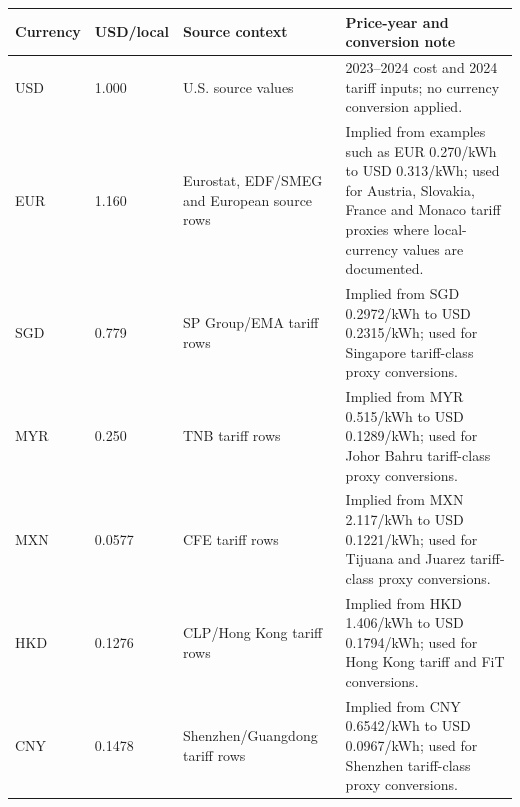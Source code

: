 \begin{tabular}{@{}llp{}p{}@{}}
\toprule
Currency & USD/local & Source context & Price-year and conversion note \\
\midrule
USD & 1.000 & U.S. source values & 2023--2024 cost and 2024 tariff inputs; no currency conversion applied. \\
EUR & 1.160 & Eurostat, EDF/SMEG and European source rows & Implied from examples such as EUR 0.270/kWh to USD 0.313/kWh; used for Austria, Slovakia, France and Monaco tariff proxies where local-currency values are documented. \\
SGD & 0.779 & SP Group/EMA tariff rows & Implied from SGD 0.2972/kWh to USD 0.2315/kWh; used for Singapore tariff-class proxy conversions. \\
MYR & 0.250 & TNB tariff rows & Implied from MYR 0.515/kWh to USD 0.1289/kWh; used for Johor Bahru tariff-class proxy conversions. \\
MXN & 0.0577 & CFE tariff rows & Implied from MXN 2.117/kWh to USD 0.1221/kWh; used for Tijuana and Juarez tariff-class proxy conversions. \\
HKD & 0.1276 & CLP/Hong Kong tariff rows & Implied from HKD 1.406/kWh to USD 0.1794/kWh; used for Hong Kong tariff and FiT conversions. \\
CNY & 0.1478 & Shenzhen/Guangdong tariff rows & Implied from CNY 0.6542/kWh to USD 0.0967/kWh; used for Shenzhen tariff-class proxy conversions. \\
\bottomrule
\end{tabular}
